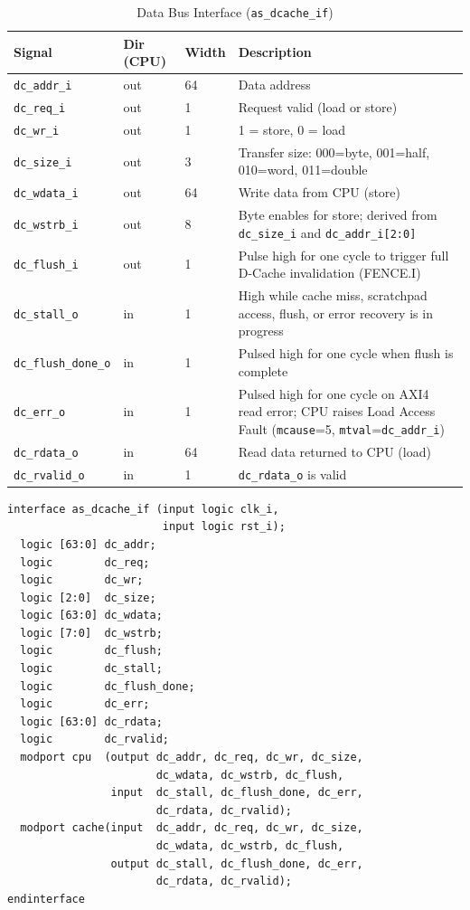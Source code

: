 \begin{table}[H]
\caption{Data Bus Interface (\texttt{as\_dcache\_if})}
\label{tab:asDBusIO}
\centering
\begin{tabularx}{\textwidth}{|l |l |l |X|}
  \hline
  Signal & Dir (CPU) & Width & Description \\
  \hline
  \hline
  \texttt{dc\_addr\_i}       & out & 64 & Data address \\
  \hline
  \texttt{dc\_req\_i}        & out & 1  & Request valid (load or store) \\
  \hline
  \texttt{dc\_wr\_i}         & out & 1  & 1 = store, 0 = load \\
  \hline
  \texttt{dc\_size\_i}       & out & 3  & Transfer size: 000=byte, 001=half, 010=word, 011=double \\
  \hline
  \texttt{dc\_wdata\_i}      & out & 64 & Write data from CPU (store) \\
  \hline
  \texttt{dc\_wstrb\_i}      & out & 8  & Byte enables for store; derived from \texttt{dc\_size\_i} and \texttt{dc\_addr\_i[2:0]} \\
  \hline
  \texttt{dc\_flush\_i}      & out & 1  & Pulse high for one cycle to trigger full D-Cache invalidation (FENCE.I) \\
  \hline
  \texttt{dc\_stall\_o}      & in  & 1  & High while cache miss, scratchpad access, flush, or error recovery is in progress \\
  \hline
  \texttt{dc\_flush\_done\_o}& in  & 1  & Pulsed high for one cycle when flush is complete \\
  \hline
  \texttt{dc\_err\_o}        & in  & 1  & Pulsed high for one cycle on AXI4 read error;
                                          CPU raises Load Access Fault (\texttt{mcause}=5,
                                          \texttt{mtval}=\texttt{dc\_addr\_i}) \\
  \hline
  \texttt{dc\_rdata\_o}      & in  & 64 & Read data returned to CPU (load) \\
  \hline
  \texttt{dc\_rvalid\_o}     & in  & 1  & \texttt{dc\_rdata\_o} is valid \\
  \hline
\end{tabularx}
\end{table}

\begin{verbatim}
interface as_dcache_if (input logic clk_i,
                        input logic rst_i);
  logic [63:0] dc_addr;
  logic        dc_req;
  logic        dc_wr;
  logic [2:0]  dc_size;
  logic [63:0] dc_wdata;
  logic [7:0]  dc_wstrb;
  logic        dc_flush;
  logic        dc_stall;
  logic        dc_flush_done;
  logic        dc_err;
  logic [63:0] dc_rdata;
  logic        dc_rvalid;
  modport cpu  (output dc_addr, dc_req, dc_wr, dc_size,
                       dc_wdata, dc_wstrb, dc_flush,
                input  dc_stall, dc_flush_done, dc_err, 
                       dc_rdata, dc_rvalid);
  modport cache(input  dc_addr, dc_req, dc_wr, dc_size,
                       dc_wdata, dc_wstrb, dc_flush,
                output dc_stall, dc_flush_done, dc_err, 
                       dc_rdata, dc_rvalid);
endinterface
\end{verbatim}

